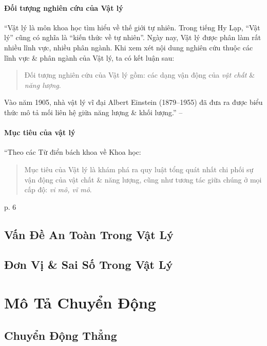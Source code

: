 \documentclass[oneside]{book}
\numberwithin{equation}{section}
\begin{document}
\subsubsection{Đối tượng nghiên cứu của Vật lý}
``Vật lý là môn khoa học tìm hiểu về thế giới tự nhiên. Trong tiếng Hy Lạp, ``Vật lý'' cũng có nghĩa là ``kiến thức về tự nhiên''. Ngày nay, Vật lý được phân làm rất nhiều lĩnh vực, nhiều phân ngành. Khi xem xét nội dung nghiên cứu thuộc các lĩnh vực \& phân ngành của Vật lý, ta có kết luận sau:

\begin{quotation}
	Đối tượng nghiên cứu của Vật lý gồm: các dạng vận động của \textit{vật chất} \& \textit{năng lượng}.
\end{quotation}
Vào năm 1905, nhà vật lý vĩ đại Albert Einstein (1879--1955) đã đưa ra được biểu thức mô tả mối liên hệ giữa năng lượng \& khối lượng.'' -- \cite[p. 5]{SGK_Vat_Ly_10_Chan_Troi_Sang_Tao}

\subsubsection{Mục tiêu của vật lý}
``Theo các Từ điển bách khoa về Khoa học:

\begin{quotation}
	Mục tiêu của Vật lý là khám phá ra quy luật tổng quát nhất chi phối sự vận động của vật chất \& năng lượng, cũng như tương tác giữa chúng ở mọi cấp độ: \textit{vi mô, vĩ mô}.
\end{quotation}
p. 6

\section{Vấn Đề An Toàn Trong Vật Lý}

\section{Đơn Vị \& Sai Số Trong Vật Lý}


\chapter{Mô Tả Chuyển Động}

\section{Chuyển Động Thẳng}
\end{document}
